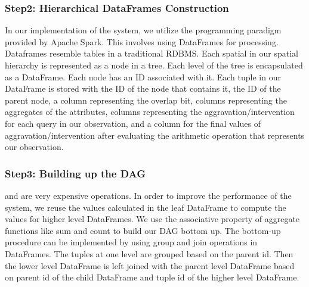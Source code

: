 \subsubsection{Step2: Hierarchical DataFrames Construction}
In our implementation of the system, we utilize the programming paradigm provided by Apache Spark. This involves using DataFrames for processing. Dataframes resemble tables in a traditional RDBMS. Each spatial {\explanation}in our spatial hierarchy is represented as a node in a tree. Each level of the tree is encapsulated as a DataFrame. Each node has an ID associated with it. Each tuple in our DataFrame is stored with the ID of the node that contains it, the ID of the parent node, a column representing the overlap bit, columns representing the aggregates of the attributes, columns representing the aggravation/intervention for each query in our observation, and a column for the final values of aggravation/intervention after evaluating the arithmetic operation that represents our observation. 


\subsubsection{Step3: Building up the DAG}
{\aggravation} and {\intervention} are very expensive operations. 
In order to improve the performance of the system, we reuse the values calculated in the leaf DataFrame to compute the values for higher level DataFrames. 
We use the associative property of aggregate functions like sum and count to build our DAG bottom up. 
The bottom-up procedure can be implemented by using group and join operations in DataFrames. 
The tuples at one level are grouped based on the parent id.  
Then the lower level DataFrame is left joined with the parent level DataFrame based on parent id of the child DataFrame and tuple id of the higher level DataFrame. 

